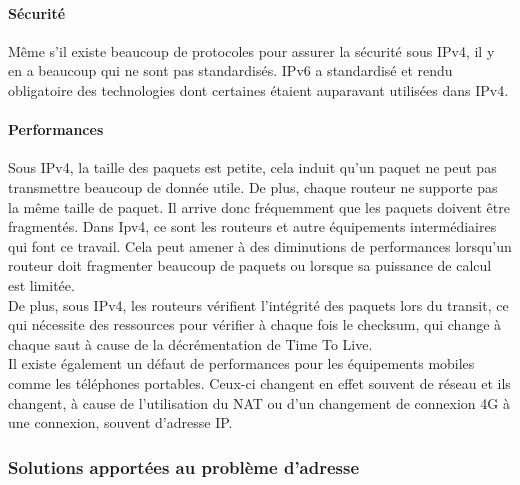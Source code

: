 \paragraph{Sécurité}
Même s'il existe beaucoup de protocoles pour assurer la sécurité sous IPv4, il
y en a beaucoup qui ne sont pas standardisés. IPv6 a standardisé et rendu
obligatoire des technologies dont certaines étaient auparavant utilisées dans
IPv4. 

\paragraph{Performances}
Sous IPv4, la taille des paquets est petite, cela induit qu'un paquet ne peut
pas transmettre beaucoup de donnée utile. De plus, chaque routeur ne supporte
pas la même taille de paquet. Il arrive donc fréquemment que les paquets
doivent être fragmentés. Dans Ipv4, ce sont les routeurs et autre équipements
intermédiaires qui font ce travail. Cela peut amener à des diminutions de
performances lorsqu'un routeur doit fragmenter beaucoup de paquets ou lorsque
sa puissance de calcul est limitée. 
\\
De plus, sous IPv4, les routeurs vérifient l'intégrité des paquets lors du
transit, ce qui nécessite des ressources pour vérifier à chaque fois le
checksum, qui change à chaque saut à cause de la décrémentation de Time To
Live.
\\
Il existe également un défaut de performances pour les équipements mobiles
comme les téléphones portables. Ceux-ci changent en effet souvent de réseau et
ils changent, à cause de l'utilisation du NAT ou d'un changement de connexion
4G à une connexion, souvent d'adresse IP. 
\\


\subsubsection{Solutions apportées au problème d'adresse}

